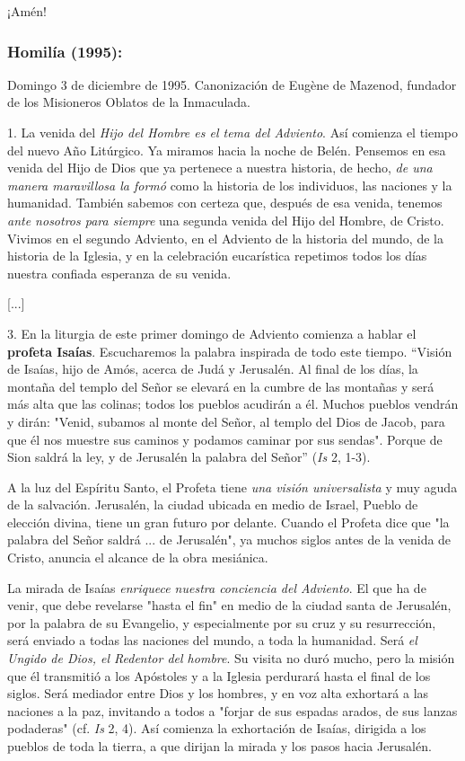 ¡Amén!

\subsubsection{Homilía (1995): }

Domingo 3 de diciembre de 1995. Canonización de Eugène de Mazenod, fundador de los Misioneros Oblatos de la Inmaculada.

1. La venida del \emph{Hijo del Hombre es el tema del Adviento}. Así comienza el tiempo del nuevo Año Litúrgico. Ya miramos hacia la noche de Belén. Pensemos en esa venida del Hijo de Dios que ya pertenece a nuestra historia, de hecho, \emph{de una manera maravillosa la formó} como la historia de los individuos, las naciones y la humanidad. También sabemos con certeza que, después de esa venida, tenemos \emph{ante nosotros para siempre} una segunda venida del Hijo del Hombre, de Cristo. Vivimos en el segundo Adviento, en el Adviento de la historia del mundo, de la historia de la Iglesia, y en la celebración eucarística repetimos todos los días nuestra confiada esperanza de su venida.

{[}...{]}

3. En la liturgia de este primer domingo de Adviento comienza a hablar el \textbf{profeta Isaías}. Escucharemos la palabra inspirada de todo este tiempo. ``Visión de Isaías, hijo de Amós, acerca de Judá y Jerusalén. Al final de los días, la montaña del templo del Señor se elevará en la cumbre de las montañas y será más alta que las colinas; todos los pueblos acudirán a él. Muchos pueblos vendrán y dirán: "Venid, subamos al monte del Señor, al templo del Dios de Jacob, para que él nos muestre sus caminos y podamos caminar por sus sendas". Porque de Sion saldrá la ley, y de Jerusalén la palabra del Señor'' (\emph{Is} 2, 1-3).

A la luz del Espíritu Santo, el Profeta tiene \emph{una visión universalista} y muy aguda de la salvación. Jerusalén, la ciudad ubicada en medio de Israel, Pueblo de elección divina, tiene un gran futuro por delante. Cuando el Profeta dice que "la palabra del Señor saldrá ... de Jerusalén", ya muchos siglos antes de la venida de Cristo, anuncia el alcance de la obra mesiánica.

La mirada de Isaías \emph{enriquece nuestra conciencia del Adviento}. El que ha de venir, que debe revelarse "hasta el fin" en medio de la ciudad santa de Jerusalén, por la palabra de su Evangelio, y especialmente por su cruz y su resurrección, será enviado a todas las naciones del mundo, a toda la humanidad. Será \emph{el Ungido de Dios, el Redentor del hombre}. Su visita no duró mucho, pero la misión que él transmitió a los Apóstoles y a la Iglesia perdurará hasta el final de los siglos. Será mediador entre Dios y los hombres, y en voz alta exhortará a las naciones a la paz, invitando a todos a "forjar de sus espadas arados, de sus lanzas podaderas" (cf. \emph{Is} 2, 4). Así comienza la exhortación de Isaías, dirigida a los pueblos de toda la tierra, a que dirijan la mirada y los pasos hacia Jerusalén.

